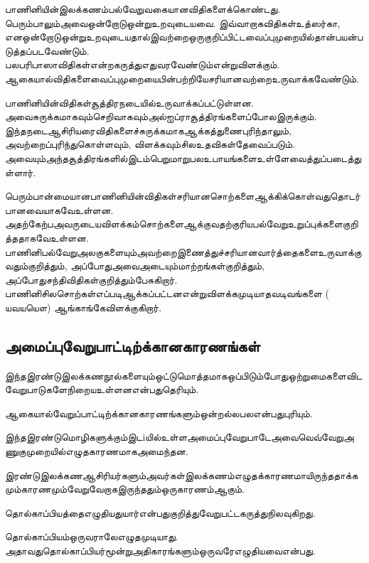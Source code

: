  \item பாணினியின்இலக்கணம்பல்வேறுவகையானவிதிகளைக்கொண்டது. பெரும்பாலும்அவைஒன்றோடுஒன்றுஉறவுடையவை. இவ்வாறாகவிதிகள்உத்ஸர்கா,  எனஒன்றோடுஒன்றுஉறவுடையதால்இவற்றைஒருகுறிப்பிட்டவைப்புமுறையில்தான்பயன்படுத்தப்படவேண்டும். பலபரிபாஸாவிதிகள்என்றகருத்துஎதுவரவேண்டும்என்றுவிளக்கும். ஆகையால்விதிகளைவைப்புமுறையைபின்பற்றியேசரியானவற்றைஉருவாக்கவேண்டும்.

 \item பாணினியின்விதிகள்சூத்திரநடையில்உருவாக்கப்பட்டுள்ளன. அவைசுருக்கமாகவும்செறிவாகவும்அல்ஐப்ராசூத்திரங்களைப்போலஇருக்கும். இந்தநடைஆசிரியரைவிதிகளைச்சுருக்கமாகஆக்கத்துணைபுரிந்தாலும், அவற்றைப்புரிந்துகொள்ளவும், விளக்கவும்சிலஉதவிகள்தேவைப்படும். அவையும்அந்தசூத்திரங்களில்இடம்பெறுமாறுபலஉபாயங்களைஉள்ளேவைத்துப்படைத்துள்ளார்.

 \item பெரும்பான்மையானபாணினியின்விதிகள்சரியானசொற்களைஆக்கிக்கொள்வதுதொடர்பானவையாகவேஉள்ளன. அதற்கேற்பஅவருடையவிளக்கம்சொற்களைஆக்குவதற்குரியபல்வேறுஉறுப்புக்களைகுறித்ததாகவேஉள்ளன. பாணினிபல்வேறுஅலகுகளையும்அவற்றைஇணைத்துச்சரியானவார்த்தைகளைஉருவாக்குவதும்குறித்தும், அப்போதுஅவைஅடையும்மாற்றங்கள்குறித்தும், அப்போதுசந்திவிதிகள்குறித்தும்பேசுகிறார். பாணினிசிலசொற்கள்எப்படிஆக்கப்பட்டனஎன்றுவிளக்கமுடியாதவடிவங்களை ( யவயயௌ) ஆங்காங்கேவிளக்குகிறார்.



\subsection{அமைப்புவேறுபாட்டிற்க்கானகாரணங்கள்}

இந்தஇரண்டுஇலக்கணநூல்களையும்ஒட்டுமொத்தமாகஒப்பிடும்போதுஒற்றுமைகளைவிடவேறுபாடுகளேநிறையஉள்ளனஎன்பதுதெரியும். 

ஆகையால்வேறுப்பாட்டிற்க்கானகாரணங்களும்ஒன்றல்லபலஎன்பதுபுரியும்.

\item இந்தஇரண்டுமொழிகளுக்கும்இடiயில்உள்ளஅமைப்புவேறுபாடேஅவைவெவ்வேறுஅணுகுமுறையில்எழுதகாரணமாகஅமைந்தன.

 \item இரண்டுஇலக்கணஆசிரியர்களும்அவர்கள்இலக்கணம்எழுதக்காரணமாயிருந்ததாக்கமும்காரணமும்வேறுவேறாகஇருந்ததும்ஒருகாரணம்ஆகும்.

 \item தொல்காப்பியத்தைஎழுதியதுயார்என்பதுகுறித்துவேறுபட்டகருத்துநிலவுகிறது.

\item தொல்காப்பியம்ஒருவராலேஎழுதமுடியாது. அதாவதுதொல்காப்பியர்மூன்றுஅதிகாரங்களும்ஒருவரேஎழுதியவைஎன்பது.

